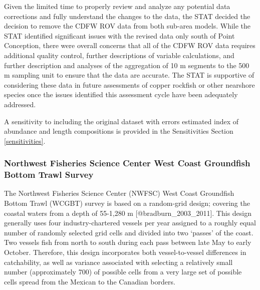 \documentclass[11pt,
  letterpaper,
]{article}
\begin{document}
Given the limited time to properly review and analyze any potential data corrections and fully understand the changes to the data, the STAT decided the decision to remove the CDFW ROV data from both sub-area models. While the STAT identified significant issues with the revised data only south of Point Conception, there were overall concerns that all of the CDFW ROV data requires additional quality control, further descriptions of variable calculations, and further description and analyses of the aggregation of 10 m segments to the 500 m sampling unit to ensure that the data are accurate. The STAT is supportive of considering these data in future assessments of copper rockfish or other nearshore species once the issues identified this assessment cycle have been adequately addressed.

A sensitivity to including the original dataset with errors estimated index of abundance and length compositions is provided in the Sensitivities Section \ref{sensitivities}.

\subsubsection{Northwest Fisheries Science Center West Coast Groundfish Bottom Trawl Survey}\label{northwest-fisheries-science-center-west-coast-groundfish-bottom-trawl-survey}

The Northwest Fisheries Science Center (NWFSC) West Coast Groundfish Bottom Trawl (WCGBT) survey is based on a random-grid design; covering the coastal waters from a depth of 55-1,280 m {[}@bradburn\_2003\_2011{]}. This design generally uses four industry-chartered vessels per year assigned to a roughly equal number of randomly selected grid cells and divided into two `passes' of the coast. Two vessels fish from north to south during each pass between late May to early October. Therefore, this design incorporates both vessel-to-vessel differences in catchability, as well as variance associated with selecting a relatively small number (approximately 700) of possible cells from a very large set of possible cells spread from the Mexican to the Canadian borders.
\end{document}
